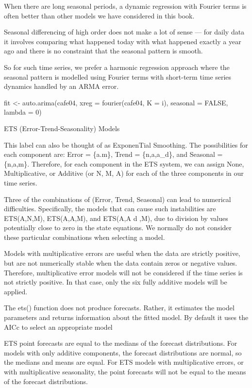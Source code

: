 \documentclass[]{book}
\theoremstyle{definition}
\theoremstyle{definition}
\theoremstyle{definition}
\theoremstyle{remark}
\begin{document}
When there are long seasonal periods, a dynamic regression with Fourier
terms is often better than other models we have considered in this book.

Seasonal differencing of high order does not make a lot of sense --- for
daily data it involves comparing what happened today with what happened
exactly a year ago and there is no constraint that the seasonal pattern
is smooth.

So for such time series, we prefer a harmonic regression approach where
the seasonal pattern is modelled using Fourier terms with short-term
time series dynamics handled by an ARMA error.

fit \textless{}- auto.arima(cafe04, xreg = fourier(cafe04, K = i),
seasonal = FALSE, lambda = 0)

ETS (Error-Trend-Seasonality) Models

This label can also be thought of as ExponenTial Smoothing. The
possibilities for each component are: Error = \{a.m\}, Trend =
\{n,a,a\_d\}, and Seasonal = \{n,a,m\}. Therefore, for each component in
the ETS system, we can assign None, Multiplicative, or Additive (or N,
M, A) for each of the three components in our time series.

Three of the combinations of (Error, Trend, Seasonal) can lead to
numerical difficulties. Specifically, the models that can cause such
instabilities are ETS(A,N,M), ETS(A,A,M), and ETS(A,A d ,M), due to
division by values potentially close to zero in the state equations. We
normally do not consider these particular combinations when selecting a
model.

Models with multiplicative errors are useful when the data are strictly
positive, but are not numerically stable when the data contain zeros or
negative values. Therefore, multiplicative error models will not be
considered if the time series is not strictly positive. In that case,
only the six fully additive models will be applied.

The ets() function does not produce forecasts. Rather, it estimates the
model parameters and returns information about the fitted model. By
default it uses the AICc to select an appropriate model

ETS point forecasts are equal to the medians of the forecast
distributions. For models with only additive components, the forecast
distributions are normal, so the medians and means are equal. For ETS
models with multiplicative errors, or with multiplicative seasonality,
the point forecasts will not be equal to the means of the forecast
distributions.
\end{document}
